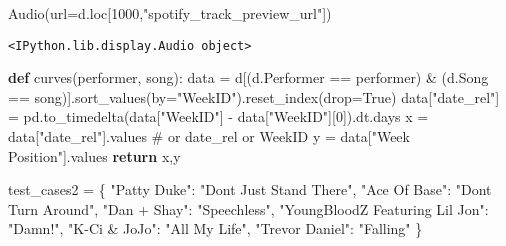 \documentclass[
  a4paper,
]{scrbook}
\newenvironment{Shaded}{\begin{snugshade}}{\end{snugshade}}
\newcommand{\CommentTok}[1]{\textcolor[rgb]{0.37,0.37,0.37}{#1}}
\newcommand{\ControlFlowTok}[1]{\textcolor[rgb]{0.00,0.23,0.31}{\textbf{#1}}}
\newcommand{\DecValTok}[1]{\textcolor[rgb]{0.68,0.00,0.00}{#1}}
\newcommand{\KeywordTok}[1]{\textcolor[rgb]{0.00,0.23,0.31}{\textbf{#1}}}
\newcommand{\NormalTok}[1]{\textcolor[rgb]{0.00,0.23,0.31}{#1}}
\newcommand{\OperatorTok}[1]{\textcolor[rgb]{0.37,0.37,0.37}{#1}}
\newcommand{\StringTok}[1]{\textcolor[rgb]{0.13,0.47,0.30}{#1}}
\newcommand{\VariableTok}[1]{\textcolor[rgb]{0.07,0.07,0.07}{#1}}
\begin{document}
\begin{Shaded}
\begin{Highlighting}[]
\NormalTok{Audio(url}\OperatorTok{=}\NormalTok{d.loc[}\DecValTok{1000}\NormalTok{,}\StringTok{"spotify\_track\_preview\_url"}\NormalTok{])}
\end{Highlighting}
\end{Shaded}

\begin{verbatim}
<IPython.lib.display.Audio object>
\end{verbatim}

\begin{Shaded}
\begin{Highlighting}[]
\KeywordTok{def}\NormalTok{ curves(performer, song):}
\NormalTok{    data }\OperatorTok{=}\NormalTok{ d[(d.Performer }\OperatorTok{==}\NormalTok{ performer) }\OperatorTok{\&}\NormalTok{ (d.Song }\OperatorTok{==}\NormalTok{ song)].sort\_values(by}\OperatorTok{=}\StringTok{"WeekID"}\NormalTok{).reset\_index(drop}\OperatorTok{=}\VariableTok{True}\NormalTok{)}
\NormalTok{    data[}\StringTok{"date\_rel"}\NormalTok{] }\OperatorTok{=}\NormalTok{ pd.to\_timedelta(data[}\StringTok{"WeekID"}\NormalTok{] }\OperatorTok{{-}}\NormalTok{ data[}\StringTok{"WeekID"}\NormalTok{][}\DecValTok{0}\NormalTok{]).dt.days}
\NormalTok{    x }\OperatorTok{=}\NormalTok{ data[}\StringTok{"date\_rel"}\NormalTok{].values }\CommentTok{\# or date\_rel or WeekID}
\NormalTok{    y }\OperatorTok{=}\NormalTok{ data[}\StringTok{"Week Position"}\NormalTok{].values}
    \ControlFlowTok{return}\NormalTok{ x,y}
\end{Highlighting}
\end{Shaded}

\begin{Shaded}
\begin{Highlighting}[]
\NormalTok{test\_cases2 }\OperatorTok{=}\NormalTok{ \{}
    \StringTok{"Patty Duke"}\NormalTok{: }\StringTok{"Don\textquotesingle{}t Just Stand There"}\NormalTok{,}
    \StringTok{"Ace Of Base"}\NormalTok{: }\StringTok{"Don\textquotesingle{}t Turn Around"}\NormalTok{,}
    \StringTok{"Dan + Shay"}\NormalTok{: }\StringTok{"Speechless"}\NormalTok{,}
    \StringTok{"YoungBloodZ Featuring Lil Jon"}\NormalTok{: }\StringTok{"Damn!"}\NormalTok{,}
    \StringTok{"K{-}Ci \& JoJo"}\NormalTok{: }\StringTok{"All My Life"}\NormalTok{,}
    \StringTok{"Trevor Daniel"}\NormalTok{: }\StringTok{"Falling"}
\NormalTok{\}}
\end{Highlighting}
\end{Shaded}
\end{document}
